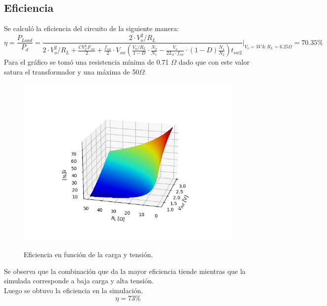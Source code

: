 \subsection{Eficiencia}
Se calculó la eficiencia del circuito de la siguiente manera:
\begin{equation}
\eta =\frac{P_{Load}}{P_{d}} = \frac{2 \cdot V_o^2 / R_L}{2 \cdot V_o^2 / R_L + \frac{CV_C^2 F_{sw}}{2} + \frac{f_{sw}}{2} \cdot V_{sw} \left( \frac{V_o / R_L}{1-D} \cdot \frac{N_2}{N_1} - \frac{V_o}{2L_2 \cdot f_{sw}} \cdot (1-D) \frac{N_1}{N_2}  \right) t_{sw2} } \Big\rvert_{V_o=3 V\ \& \ R_L=6.25 \Omega } = 70.35\%
\end{equation}
Para el gráfico se tomó una resistencia mínima de 0.71 $\Omega$ dado que con este valor satura el transformador y una máxima de 50$\Omega$.
\begin{figure}[H]
	\centering
	\includegraphics[width=0.5\linewidth]{ImagenesParteII/Eff.png}
	\label{fig:etar}
	\caption{Eficiencia en función de la carga y tensión.}
\end{figure}
Se observa que la combinación que da la mayor eficiencia tiende 
mientras que la simulada corresponde a baja carga y alta tensión.\\
Luego se obtuvo la eficiencia en la simulación.
\begin{equation}
\eta = 73\%
\end{equation}
%
